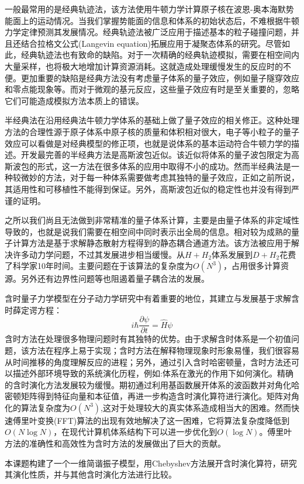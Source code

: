 一般最常用的是经典轨迹法\cite{classical_trajectory_1,classical_trajectory_2}，该方法使用牛顿力学计算原子核在波恩-奥本海默势能面上的运动情况。当我们掌握势能面的信息和体系的初始状态后，不难根据牛顿力学定律预测其发展情况。经典轨迹法被广泛应用于描述基本的粒子碰撞问题，并且还结合拉格文公式(Langevin equation)拓展应用于凝聚态体系的研究\cite{classical_extend}。尽管如此，经典轨迹法也有致命的缺陷。对于一次精确的经典轨迹模拟，需要在相空间内大量采样，也将极大地增加计算资源消耗。这就造成处理缓慢发生的反应时的不便。更加重要的缺陷是经典方法没有考虑量子体系的量子效应，例如量子隧穿效应和零点能现象等。而对于微观的基元反应，这些量子效应有时是至关重要的，忽略它们可能造成模拟方法本质上的错误。

半经典法在沿用经典法牛顿力学体系的基础上做了量子效应的相关修正\cite{semi_classical_1,semi_classical_2,semi_classical_3}。这种处理方法的合理性源于原子体系中原子核的质量和体积相对很大，电子等小粒子的量子效应可以看做是对经典模型的修正项，也就是说体系的基本运动符合牛顿力学的描述。开发最完善的半经典方法是高斯波包近似。该近似将体系的量子波包限定为高斯波包的形式，这一方法在很多体系的应用中取得不小的成功。然而半经典法是一种较微妙的方法，对于每一种体系需要做考虑其独特的量子效应，正如之前所说，其适用性和可移植性不能得到保证。另外，高斯波包近似的稳定性也并没有得到严谨的证明。

之所以我们尚且无法做到非常精准的量子体系计算，主要是由量子体系的非定域性导致的，也就是说我们需要在相空间中同时表示出全局的信息。相对较为成熟的量子计算方法是基于求解静态散射方程得到的静态耦合通道方法\cite{Coupled_Channel}。该方法被应用于解决许多动力学问题，不过其发展进步相当缓慢。从$H + H_2$体系发展到$D + H_2$花费了科学家10年时间\cite{H2D}。主要问题在于该算法的复杂度为$O(N^3)$，占用很多计算资源。另外还有边界性问题等也阻遏着量子耦合法的发展。

含时量子力学模型在分子动力学研究中有着重要的地位，其建立与发展基于求解含时薛定谔方程\cite{TD_Schrodinger_1,TD_Schrodinger_2,TD_Schrodinger_3,TD_Schrodinger_4,TD_Schrodinger_5}：
\begin{equation}
  i \hbar \frac{\partial \psi}{\partial t} = \hat{H} \psi  
  \label{eq:td-Schrodinger}
\end{equation} 
含时方法在处理很多物理问题时有其独特的优势。由于求解含时体系是一个初值问题，该方法在程序上易于实现；含时方法在解释物理现象时形象易懂，我们很容易从时间推移的角度理解反应的进程；另外，通过引入含时哈密顿量，含时方法还可以描述外部环境导致的系统演化历程，例如:体系在激光的作用下如何演化。精确的含时演化方法发展较为缓慢。期初通过利用基函数展开体系的波函数并对角化哈密顿矩阵得到特征向量和本征值，再进一步构造含时演化算符进行演化。矩阵对角化的算法复杂度为$O(N^3)$,这对于处理较大的真实体系造成相当大的困难。然而快速傅里叶变换(FFT)算法的出现有效地解决了这一困难，它将算法复杂度降低到$O(N\log N)$\cite{FFT_1,FFT_2}，在现代计算机体系结构下可以进一步优化到$O(\log N)$\cite{FFT_3}。傅里叶方法的准确性和高效性为含时方法的发展做出了巨大的贡献。

本课题构建了一个一维简谐振子模型，用Chebyshev方法展开含时演化算符，研究其演化性质，并与其他含时演化方法进行比较。